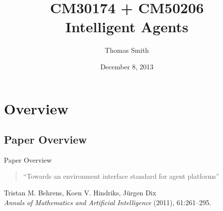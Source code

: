 \documentclass[t]{beamer}
\author[TAES]{Thomas Smith}
\title[CM30174/CM50206]{CM30174 + CM50206\\Intelligent Agents}
\institute[Bath/CS]{East Building}
\date{December 8, 2013}
\begin{document}
\begin{frame}
  \titlepage
\end{frame}

\section{Overview}
\subsection{Paper Overview}
\begin{frame}[c]{Paper Overview}
	\begin{quote}
		``Towards an environment interface standard for agent platforms''
	\end{quote}
	\hfill Tristan M. Behrens, Koen V. Hindriks, J{\"u}rgen Dix\\
	\hfill {\tiny \textit{Annals of Mathematics and Artificial Intelligence} (2011), 61:261--295.}
\end{frame}
\end{document}
